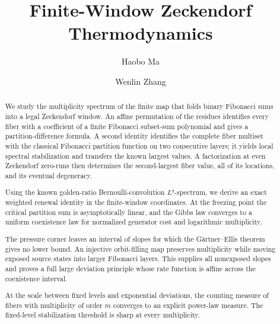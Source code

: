 \documentclass[12pt,reqno]{amsart}
\title[Finite-window Zeckendorf thermodynamics]{Finite-Window Zeckendorf Thermodynamics}
\author{Haobo Ma}
\author{Wenlin Zhang}
\date{}
\theoremstyle{plain}
\theoremstyle{remark}
\theoremstyle{definition}
\numberwithin{equation}{section}
\begin{document}
\begin{abstract}
We study the multiplicity spectrum of the finite map that folds binary
Fibonacci sums into a legal Zeckendorf window.  An affine permutation of the
residues identifies every fiber with a coefficient of a finite Fibonacci
subset-sum polynomial and gives a partition-difference formula.  A second
identity identifies the complete fiber multiset with the classical
Fibonacci partition function on two consecutive layers; it yields local
spectral stabilization and transfers the known largest values.  A
factorization at even Zeckendorf zero-runs then determines the second-largest
fiber value, all of its locations, and its eventual degeneracy.

Using the known golden-ratio Bernoulli-convolution \(L^q\)-spectrum, we
derive an exact weighted renewal identity in the finite-window coordinates.
At the freezing point the critical partition sum is asymptotically linear,
and the Gibbs law converges to a uniform coexistence law for normalized
generator cost and logarithmic multiplicity.

The pressure corner leaves an interval of slopes for which the
G\"artner--Ellis theorem gives no lower bound.  An injective orbit-filling
map preserves multiplicity while moving exposed source states into larger
Fibonacci layers.  This supplies all nonexposed slopes and proves a full
large deviation principle whose rate function is affine across the
coexistence interval.

At the scale between fixed levels and exponential deviations, the counting
measure of fibers with multiplicity of order \(m\) converges to an explicit
power-law measure.  The fixed-level stabilization threshold is sharp at
every multiplicity.
\end{abstract}

\maketitle









\end{document}
